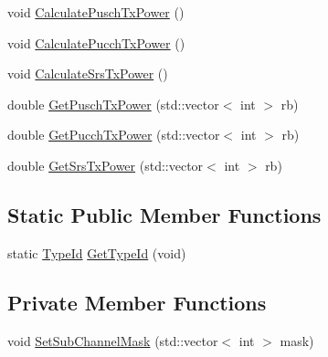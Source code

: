 \begin{DoxyCompactItemize}
\item 
void \hyperlink{classns3_1_1LteUePowerControl_ab12af7a34a98fb6d9041ee2c12e7157e}{Calculate\+Pusch\+Tx\+Power} ()
\item 
void \hyperlink{classns3_1_1LteUePowerControl_ace41fb0f9967eef8955090a536395bf9}{Calculate\+Pucch\+Tx\+Power} ()
\item 
void \hyperlink{classns3_1_1LteUePowerControl_af03ed0aac49e53e8a7a1e26199d46d4d}{Calculate\+Srs\+Tx\+Power} ()
\item 
double \hyperlink{classns3_1_1LteUePowerControl_acfc4ff4ef22f8f408ba02cb38122f957}{Get\+Pusch\+Tx\+Power} (std\+::vector$<$ int $>$ rb)
\item 
double \hyperlink{classns3_1_1LteUePowerControl_a8d592c40dcedb94e7db3978e7c876fa2}{Get\+Pucch\+Tx\+Power} (std\+::vector$<$ int $>$ rb)
\item 
double \hyperlink{classns3_1_1LteUePowerControl_adb93130c6a533d766260640d4c41037a}{Get\+Srs\+Tx\+Power} (std\+::vector$<$ int $>$ rb)
\end{DoxyCompactItemize}
\subsection*{Static Public Member Functions}
\begin{DoxyCompactItemize}
\item 
static \hyperlink{classns3_1_1TypeId}{Type\+Id} \hyperlink{classns3_1_1LteUePowerControl_af1e5b1f2309616cbebfb381bcd3d1689}{Get\+Type\+Id} (void)
\end{DoxyCompactItemize}
\subsection*{Private Member Functions}
\begin{DoxyCompactItemize}
\item 
void \hyperlink{classns3_1_1LteUePowerControl_ab3aa8b1c303adc8b271e917670536a1f}{Set\+Sub\+Channel\+Mask} (std\+::vector$<$ int $>$ mask)
\end{DoxyCompactItemize}
